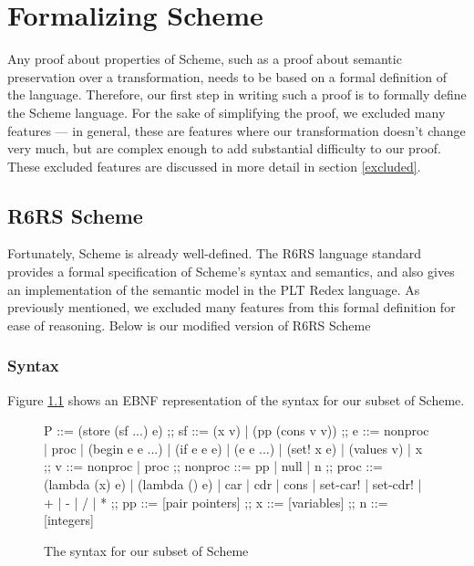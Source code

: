 \chapter{Formalizing Scheme}
Any proof about properties of Scheme, such as a proof about semantic preservation over a transformation, needs to be based on a formal definition of the language. Therefore, our first step in writing such a proof is to formally define the Scheme language. For the sake of simplifying the proof, we excluded many features --- in general, these are features where our transformation doesn't change very much, but are complex enough to add substantial difficulty to our proof. These excluded features are discussed in more detail in section \ref{excluded}.
\section{R6RS Scheme}
Fortunately, Scheme is already well-defined. The R6RS language standard \cite{x} provides a formal specification of Scheme's syntax and semantics, and also gives an implementation of the semantic model in the PLT Redex language. As previously mentioned, we excluded many features from this formal definition for ease of reasoning. Below is our modified version of R6RS Scheme

\subsection{Syntax}
Figure \ref{fig:syntax} shows an EBNF representation of the syntax for our subset of Scheme.
\newpage
\begin{figure}[h]
    \centering
\begin{bnfgrammar}
    P ::=
        (store (sf ...) e)
    ;;
    sf ::=
        (x v)
    |   (pp (cons v v))
    ;;
    e ::=
        nonproc
    |   proc
    |   (begin e e ...)
    |   (if e e e)
    |   (e e ...)
    |   (set! x e)
    |   (values v)
    |   x
    ;;
    v ::=
        nonproc
    |   proc
    ;;
    nonproc ::=
        pp
    |   null
    |   n
    ;;
    proc ::=
        (lambda (x) e)
    |   (lambda () e)
    |   car
    |   cdr
    |   cons
    |   set-car!
    |   set-cdr!
    |   +   
    |   -
    |   /
    |   *
    ;;
    pp ::=
        [pair pointers]
    ;;
    x ::=
        [variables]
    ;;
    n ::=
        [integers]
\end{bnfgrammar}
\caption{The syntax for our subset of Scheme}
    \label{fig:syntax}
\end{figure}

